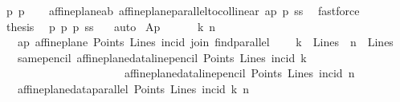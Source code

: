 \begin{isabellebody}
\ p{}{}\ p{}{}\isanewline
\ \ \isamarkupfalse%
\ affine{\isacharunderscore}{\kern0pt}plane{\isachardot}{\kern0pt}a{}b\ affine{\isacharunderscore}{\kern0pt}plane{\isachardot}{\kern0pt}parallel{\isacharunderscore}{\kern0pt}to{\isacharunderscore}{\kern0pt}collinear\ ap\ p{}{}\ ss\ \isamarkupfalse%
\ fastforce\isanewline
\ \ \isanewline
\ \ \isamarkupfalse%
\ {\isacharquery}{\kern0pt}thesis\ \isamarkupfalse%
\ p{}{}\ p{}\ p{}\ ss\ \ \isamarkupfalse%
\ auto\isanewline
{}\isamarkupfalse%
%
\endisatagproof
{\isafoldproof}%
%
\isadelimproof
%
\endisadelimproof
\isanewline
\isanewline
{}\isamarkupfalse%
\ Ap{}{}{\isacharcolon}{\kern0pt}\ \ \ \isanewline
\ \ \ k\ n\isanewline
\ \ \ ap{\isacharcolon}{\kern0pt}\ {\isachardoublequoteopen}affine{\isacharunderscore}{\kern0pt}plane\ Points\ Lines\ incid\ join\ find{\isacharunderscore}{\kern0pt}parallel{\isachardoublequoteclose}\ \isanewline
\ \ \ {\isachardoublequoteopen}k\ {\isasymin}\ Lines{\isachardoublequoteclose}\ \ {\isachardoublequoteopen}n\ {\isasymin}\ Lines{\isachardoublequoteclose}\isanewline
\ \ \ same{\isacharunderscore}{\kern0pt}pencil{\isacharcolon}{\kern0pt}\ {\isachardoublequoteopen}{\isacharparenleft}{\kern0pt}affine{\isacharunderscore}{\kern0pt}plane{\isacharunderscore}{\kern0pt}data{\isachardot}{\kern0pt}line{\isacharunderscore}{\kern0pt}pencil\ Points\ Lines\ {\isacharparenleft}{\kern0pt}incid{\isacharparenright}{\kern0pt}\ k{\isacharparenright}{\kern0pt}\ {\isacharequal}{\kern0pt}\isanewline
\ \ \ \ \ \ \ \ \ \ \ \ \ \ \ \ \ \ \ \ \ \ {\isacharparenleft}{\kern0pt}affine{\isacharunderscore}{\kern0pt}plane{\isacharunderscore}{\kern0pt}data{\isachardot}{\kern0pt}line{\isacharunderscore}{\kern0pt}pencil\ Points\ Lines\ {\isacharparenleft}{\kern0pt}incid{\isacharparenright}{\kern0pt}\ n{\isacharparenright}{\kern0pt}{\isachardoublequoteclose}\isanewline
\ \ \ {\isachardoublequoteopen}{\isacharparenleft}{\kern0pt}affine{\isacharunderscore}{\kern0pt}plane{\isacharunderscore}{\kern0pt}data{\isachardot}{\kern0pt}parallel\ Points\ Lines\ incid\ k\ n{\isacharparenright}{\kern0pt}{\isachardoublequoteclose}\isanewline
%
\isadelimproof
%
\endisadelimproof
%
\isatagproof
{}\isamarkupfalse%

\end{isabellebody}
